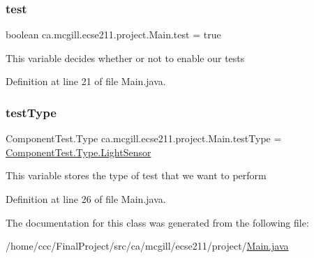 \subsubsection{\texorpdfstring{test}{test}}
{\footnotesize\ttfamily boolean ca.\+mcgill.\+ecse211.\+project.\+Main.\+test = true\hspace{0.3cm}{\ttfamily [static]}}

This variable decides whether or not to enable our tests 

Definition at line 21 of file Main.\+java.

\mbox{\label{classca_1_1mcgill_1_1ecse211_1_1project_1_1_main_a8dac740460370f76ac0db5dc20824b1f}} 
\subsubsection{\texorpdfstring{test\+Type}{testType}}
{\footnotesize\ttfamily Component\+Test.\+Type ca.\+mcgill.\+ecse211.\+project.\+Main.\+test\+Type = \hyperlink{enumca_1_1mcgill_1_1ecse211_1_1tests_1_1_component_test_1_1_type_aa8c9262ad5014cd52ecce2eec6604510}{Component\+Test.\+Type.\+Light\+Sensor}\hspace{0.3cm}{\ttfamily [static]}}

This variable stores the type of test that we want to perform 

Definition at line 26 of file Main.\+java.



The documentation for this class was generated from the following file\+:\begin{DoxyCompactItemize}
\item 
/home/ccc/\+Final\+Project/src/ca/mcgill/ecse211/project/\hyperlink{_main_8java}{Main.\+java}\end{DoxyCompactItemize}
